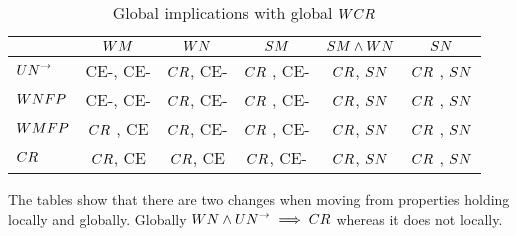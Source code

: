 \begin{table}[h!]
    \centering
    \caption{Global implications with global $\WCR$}
    \begin{tabular}{|l|c|c|c|c|c|}
    \hline
            & $\WM$         & $\WN$         & $\SM$             & $\SMandWN$        & $\SN$ \\
    \hline
    $\UNto$ &  CE-, CE-     & $\CR$, CE-    &  $\CR$ , CE-      & $\CR$, $\SN$      &  $\CR$ , $\SN$ \\
    \hline
    $\WNFP$ & CE-, CE-      & $\CR$, CE-    &  $\CR$ , CE-      & $\CR$, $\SN$      &  $\CR$ , $\SN$ \\
    \hline
    $\WMFP$ & $\CR$ , CE    & $\CR$, CE-    &  $\CR$ , CE-      & $\CR$, $\SN$      &  $\CR$ , $\SN$ \\
    \hline
    $\CR$   & $\CR$, CE     & $\CR$, CE     &  $\CR$, CE-       & $\CR$, $\SN$      & $\CR$ , $\SN$ \\
    \hline
    
    \end{tabular}
\end{table}


The tables show that there are two changes when moving from properties holding locally and globally. 
Globally $\WN \land \UNto \implies \CR$ whereas it does not locally. 